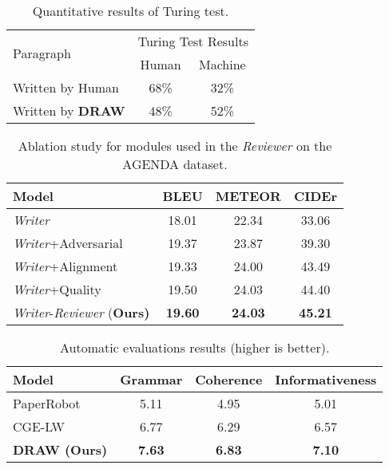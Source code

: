 \documentclass[letterpaper]{article}
\begin{document}
\begin{table}[t]
	\centering

	\begin{tabular}{l|c c}
		\hline
		\multirow{2}[0]{*}{Paragraph} & \multicolumn{2}{c}{Turing Test Results}\\
		\cline{2-3}
		 & Human & Machine             \\ \hline
		Written by Human & 68\%    & 32\% \\ 
		Written by \textbf{DRAW} & 48\%   & 52\% \\ \hline
	\end{tabular}
	\caption{Quantitative results of Turing test.}
	\label{tab:Turing}
\end{table}


\begin{table}[t]
	\centering
	
	\begin{tabular}{l|ccc}
		\hline
		Model & BLEU & METEOR   &CIDEr         \\ \hline
		\textit{Writer}  & 18.01    & 22.34   &33.06 \\
		\textit{Writer}+Adversarial  & 19.37    & 23.87   &39.30 \\ 
		\textit{Writer}+Alignment & 19.33    & 24.00   &43.49 \\ 
		\textit{Writer}+Quality & 19.50    & 24.03    &44.40 \\ \hline
		\textit{Writer}-\textit{Reviewer} (\textbf{Ours)}     &\textbf{19.60}    & \textbf{24.03}   &\textbf{45.21} \\ \hline
	\end{tabular}
	\caption{Ablation study for modules used in the \textit{Reviewer} on the AGENDA dataset.}
	\label{tab:reviewer}
\end{table}

\begin{table}[t]
	\centering
  	
	\resizebox{\textwidth}{!}
	{
	\begin{tabular}{l|ccc}
		\hline
		Model       & Grammar   & Coherence   & Informativeness    \\\hline
		PaperRobot       & 5.11      &4.95    &5.01     \\ 
		CGE-LW       & 6.77     & 6.29   & 6.57   \\ \hline
		\textbf{DRAW (Ours) }             &\textbf{7.63}     &\textbf{6.83}  &\textbf{7.10}   \\ \hline
	\end{tabular}
\caption{Automatic evaluations results (higher is better).}
	
	\label{tab:group_human}
	}
\end{table}
\end{document}
